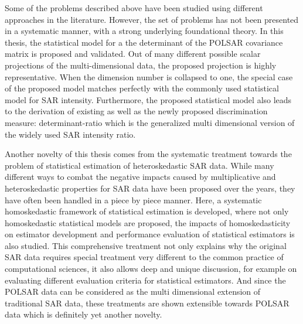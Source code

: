 Some of the problems described above have been studied using different approaches in the literature.
However, the set of problems has not been presented in a systematic manner, with a strong underlying foundational theory.
In
                this thesis, the statistical model for a the determinant
                of the POLSAR covariance matrix is proposed and
                validated.
Out
                of many different possible scalar projections of the
                multi-dimensional data, the proposed projection is
                highly representative.
When the dimension number is collapsed to one, the
                special case of the proposed model matches perfectly
                with the commonly used statistical model for SAR
                intensity.
Furthermore,
                the proposed statistical model also leads to the
                derivation of existing as well as the newly proposed
                discrimination measure: determinant-ratio which is the
                generalized multi dimensional version of the widely used
                SAR intensity ratio.

 Another
                novelty of this thesis comes from the systematic
                treatment towards the problem of statistical estimation
                of heteroskedastic SAR data.
While
                many different ways to combat the negative impacts
                caused by multiplicative and heteroskedastic properties
                for SAR data have been proposed over the years, they have often been
                handled in a piece by piece manner.
Here,
                a systematic homoskedastic framework of statistical
                estimation is developed, where not only homoskedastic
                statistical models are proposed, the impacts of
                homoskedasticity on estimator development and
                performance evaluation of statistical estimators is also
                studied.
This
                comprehensive treatment not only explains why the
                original SAR data requires special treatment very
                different to the common practice of computational
                sciences, 
it
                also allows deep and unique discussion, for example on
                evaluating different evaluation criteria for statistical
                estimators.  %
And
                since the POLSAR data can be considered as the multi
                dimensional extension of traditional SAR data, these
                treatments are shown extensible towards POLSAR data
                which is definitely yet another novelty. 

